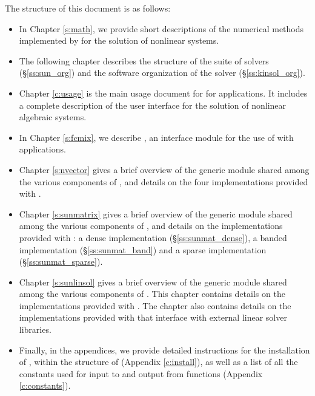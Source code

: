 The structure of this document is as follows:
\begin{itemize}
\item
  In Chapter \ref{s:math}, we provide short descriptions of the numerical
  methods implemented by {\kinsol} for the solution of nonlinear systems.
\item
  The following chapter describes the structure of the {\sundials} suite
  of solvers (\S\ref{ss:sun_org}) and the software organization of the {\kinsol}
  solver (\S\ref{ss:kinsol_org}).
\item
  Chapter \ref{c:usage} is the main usage document for {\kinsol} for {\CC} applications.
  It includes a complete description of the user interface for the solution
  of nonlinear algebraic systems.
\item
  In Chapter \ref{s:fcmix}, we describe {\fkinsol}, an interface module for the
  use of {\kinsol} with {\F} applications.
\item
  Chapter \ref{s:nvector} gives a brief overview of the generic {\nvector} module
  shared among the various components of {\sundials}, and details on the four
  {\nvector} implementations provided with {\sundials}.
\item
Chapter \ref{s:sunmatrix} gives a brief overview of the generic
  {\sunmatrix} module shared among the various components of
  {\sundials}, and details on the {\sunmatrix} implementations
  provided with {\sundials}:
  a dense implementation (\S\ref{ss:sunmat_dense}),
  a banded implementation (\S\ref{ss:sunmat_band}) and
  a sparse implementation (\S\ref{ss:sunmat_sparse}).
\item
  Chapter \ref{s:sunlinsol} gives a brief overview of the generic
  {\sunlinsol} module shared among the various components of
  {\sundials}.  This chapter contains details on the {\sunlinsol}
  implementations provided with {\sundials}.
  The chapter
  also contains details on the {\sunlinsol} implementations provided
  with {\sundials} that interface with external linear solver
  libraries.
\item
  Finally, in the appendices, we provide detailed instructions for the installation
  of {\kinsol}, within the structure of {\sundials} (Appendix \ref{c:install}), as well
  as a list of all the constants used for input to and output from {\kinsol} functions
  (Appendix \ref{c:constants}).
\end{itemize}

